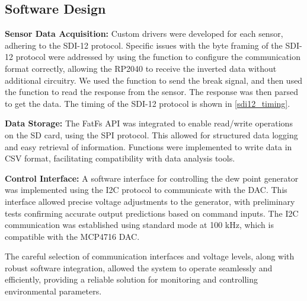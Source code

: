 \subsection{Software Design}
\textbf{Sensor Data Acquisition:} Custom drivers were developed for each sensor, adhering to the SDI-12 protocol. Specific issues with the byte framing of the SDI-12 protocol were addressed by using the  function to configure the communication format correctly, allowing the RP2040 to receive the inverted data without additional circuitry. We used the  function to send the break signal, and then used the  function to read the response from the sensor. The response was then parsed to get the data. The timing of the SDI-12 protocol is shown in \cref{sdi12_timing}.

\textbf{Data Storage:} The FatFs API was integrated to enable read/write operations on the SD card, using the SPI protocol. This allowed for structured data logging and easy retrieval of information. Functions were implemented to write data in CSV format, facilitating compatibility with data analysis tools.

\textbf{Control Interface:}  A software interface for controlling the dew point generator was implemented using the I2C protocol to communicate with the DAC. This interface allowed precise voltage adjustments to the generator, with preliminary tests confirming accurate output predictions based on command inputs. The I2C communication was established using standard mode at 100 kHz, which is compatible with the MCP4716 DAC.

The careful selection of communication interfaces and voltage levels, along with robust software integration, allowed the system to operate seamlessly and efficiently, providing a reliable solution for monitoring and controlling environmental parameters.